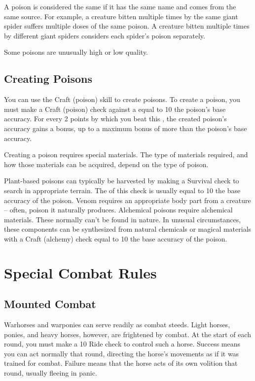         A poison is considered the same if it has the same name and comes from the same source.
        For example, a creature bitten multiple times by the same giant spider suffers multiple doses of the same poison.
        A creature bitten multiple times by different giant spiders considers each spider's poison separately.

         Some poisons are unusually high or low quality.

    \subsection{Creating Poisons}\label{Creating Poisons}

        You can use the Craft (poison) skill to create poisons.
        To create a poison, you must make a Craft (poison) check against a  equal to 10 \add the poison's base accuracy.
        For every 2 points by which you beat this , the created poison's accuracy gains a  bonus, up to a maximum bonus of  more than the poison's base accuracy.

        Creating a poison requires special materials.
        The type of materials required, and how those materials can be acquired, depend on the type of poison.

        \begin{itemize}
             Plant-based poisons can typically be harvested by making a Survival check to search in appropriate terrain.
                The  of this check is usually equal to 10 \add the base accuracy of the poison.
             Venom requires an appropriate body part from a creature -- often, poison it naturally produces.
             Alchemical poisons require alchemical materials.
                These normally can't be found in nature.
                In unusual circumstances, these components can be synthesized from natural chemicals or magical materials with a Craft (alchemy) check equal to 10 \add the base accuracy of the poison.
        \end{itemize}

\section{Special Combat Rules}

    \subsection{Mounted Combat}\label{Mounted Combat}
         Warhorses and warponies can serve readily as combat steeds. Light horses, ponies, and heavy horses, however, are frightened by combat.
        At the start of each round, you must make a  10 Ride check to control such a horse.
        Success means you can act normally that round, directing the horse's movements as if it was trained for combat.
        Failure means that the horse acts of its own volition that round, usually fleeing in panic.

